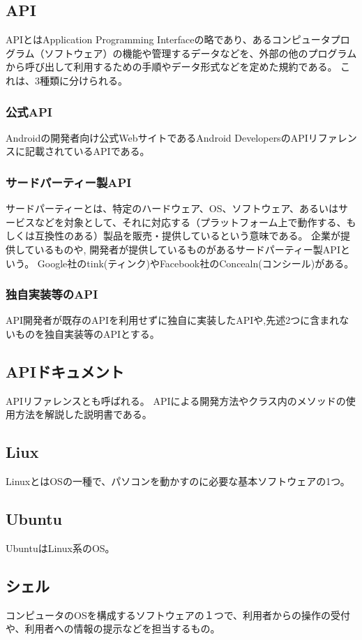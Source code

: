 \subsection{API}
APIとはApplication Programming Interfaceの略であり、あるコンピュータプログラム（ソフトウェア）の機能や管理するデータなどを、外部の他のプログラムから呼び出して利用するための手順やデータ形式などを定めた規約である。
これは、3種類に分けられる。

\subsubsection {公式API}
Androidの開発者向け公式WebサイトであるAndroid DevelopersのAPIリファレンスに記載されているAPIである。

\subsubsection {サードパーティー製API}
サードパーティーとは、特定のハードウェア、OS、ソフトウェア、あるいはサービスなどを対象として、それに対応する（プラットフォーム上で動作する、もしくは互換性のある）製品を販売・提供しているという意味である。
企業が提供しているものや, 開発者が提供しているものがあるサードパーティー製APIという。
Google社のtink(ティンク)やFacebook社のConcealn(コンシール)がある。


\subsubsection {独自実装等のAPI}
API開発者が既存のAPIを利用せずに独自に実装したAPIや,先述2つに含まれないものを独自実装等のAPIとする。

\subsection{APIドキュメント}
APIリファレンスとも呼ばれる。
APIによる開発方法やクラス内のメソッドの使用方法を解説した説明書である。

\subsection{Liux}
LinuxとはOSの一種で、パソコンを動かすのに必要な基本ソフトウェアの1つ。

\subsection{Ubuntu}
UbuntuはLinux系のOS。

\subsection{シェル}
コンピュータのOSを構成するソフトウェアの１つで、利用者からの操作の受付や、利用者への情報の提示などを担当するもの。

